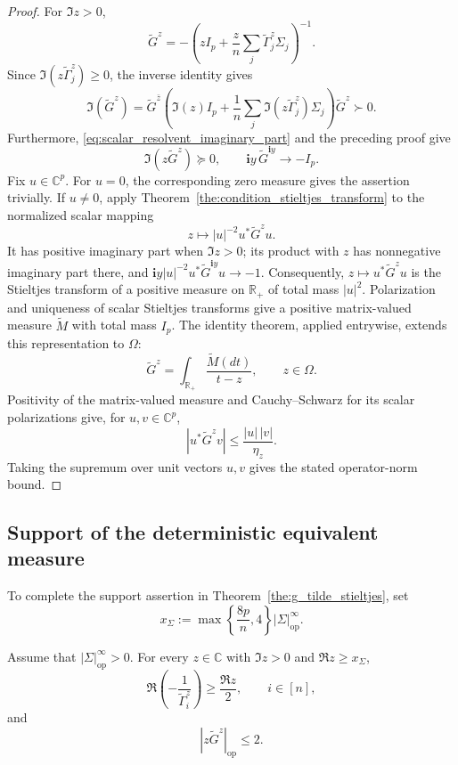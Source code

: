 \documentclass[EJP, preprint, NODS, nobera, nofontexpansion]{ejpecp}
\newcommand{\ii}{\mathbf{i}}
\DeclareMathOperator{\op}{op}
\begin{document}
\begin{proof}
For \(\Im z>0\),
\[
    \tilde G^z
    =
    -\left(
        zI_p+\frac zn\sum_j\tilde\Gamma_j^z\Sigma_j
    \right)^{-1}.
\]
Since \(\Im(z\tilde\Gamma_j^z)\geq0\), the inverse identity gives
\[
    \Im(\tilde G^z)
    =
    \tilde G^{\bar z}
    \left(
        \Im(z)I_p+\frac1n\sum_j\Im(z\tilde\Gamma_j^z)\Sigma_j
    \right)
    \tilde G^z
    \succ0.
\]
Furthermore, \eqref{eq:scalar_resolvent_imaginary_part} and the preceding
proof give
\[
    \Im(z\tilde G^z)
    \succeq0,
    \qquad
    \ii y\,\tilde G^{\ii y}\longrightarrow-I_p.
\]
Fix \(u\in\mathbb C^p\).  For \(u=0\), the corresponding zero measure
gives the assertion trivially.
If \(u\neq0\), apply
Theorem~\ref{the:condition_stieltjes_transform} to the normalized scalar
mapping
\[
    z\longmapsto |u|^{-2}u^*\tilde G^zu.
\]
It has positive imaginary part when \(\Im z>0\); its product with \(z\) has
nonnegative imaginary part there, and
\(\ii y|u|^{-2}u^*\tilde G^{\ii y}u\to-1\).  Consequently,
\(z\mapsto u^*\tilde G^zu\) is the Stieltjes transform of a positive
measure on \(\mathbb R_+\) of total mass \(|u|^2\).
Polarization and uniqueness of scalar Stieltjes transforms give a
positive matrix-valued measure \(\tilde M\) with total mass \(I_p\).
The identity theorem, applied entrywise, extends this representation
to \(\Omega\):
\[
    \tilde G^z
    =
    \int_{\mathbb R_+}\frac{\tilde M(dt)}{t-z},
    \qquad z\in\Omega.
\]
Positivity of the matrix-valued measure and Cauchy--Schwarz for its scalar
polarizations give, for \(u,v\in\mathbb C^p\),
\[
    |u^*\tilde G^zv|
    \leq\frac{|u|\,|v|}{\eta_z}.
\]
Taking the supremum over unit vectors \(u,v\) gives the stated
operator-norm bound.
\end{proof}


\subsection{Support of the deterministic equivalent measure}
\label{sse:deterministic_equivalent_support}

To complete the support assertion in
Theorem~\ref{the:g_tilde_stieltjes}, set
\[
    x_\Sigma
    :=
    \max\left\{\frac{8p}{n},4\right\}|\Sigma|_{\op}^\infty.
\]
\begin{lemma}\label{lem:large_real_part_resolvent_bounds}
Assume that \(|\Sigma|_{\op}^\infty>0\). For every \(z\in\mathbb C\)
with \(\Im z>0\) and \(\Re z\geq x_\Sigma\),
\[
    \Re\left(-\frac1{\tilde\Gamma_i^z}\right)
    \geq\frac{\Re z}{2},
    \qquad i\in[n],
\]
and
\[
    |z\tilde G^z|_{\op}\leq2.
\]
\end{lemma}
\end{document}
